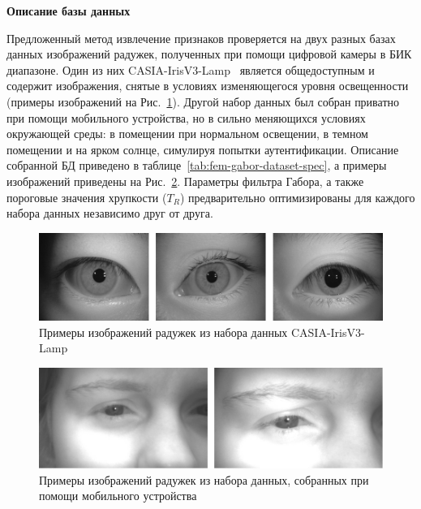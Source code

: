 {\bf Описание базы данных}
\label{sec:fem-gabor-dataset-desc}

Предложенный метод извлечение признаков проверяется на двух разных базах данных изображений радужек, полученных при помощи цифровой камеры в БИК диапазоне. Один из них CASIA-IrisV3-Lamp~\cite{casia_v3_lamp} является общедоступным и содержит изображения, снятые в условиях изменяющегося уровня освещенности (примеры изображений на Рис.~\ref{fig:fem-gabor-db-examples-casiav3}). Другой набор данных был собран приватно при помощи мобильного устройства, но в сильно меняющихся условиях окружающей среды: в помещении при нормальном освещении, в темном помещении и на ярком солнце, симулируя попытки аутентификации. Описание собранной БД приведено в таблице~\ref{tab:fem-gabor-dataset-spec}, а примеры изображений приведены на Рис.~\ref{fig:fem-gabor-db-examples-mobile}. Параметры фильтра Габора, а также пороговые значения хрупкости ($T_R$) предварительно оптимизированы для каждого набора данных независимо друг от друга.

\medspace
\begin{figure}[h]
	\begin{center}
		\includegraphics[width=0.75\columnwidth]{pictures/fem-gabor-db-examples-casiav3.png}
		\caption{Примеры изображений радужек из набора данных CASIA-IrisV3-Lamp}
		\label{fig:fem-gabor-db-examples-casiav3}
	\end{center}
\end{figure}

\begin{figure}[h]
	\begin{center}
		\includegraphics[width=0.75\columnwidth]{pictures/fem-gabor-db-examples-mobile.png}
		\caption{Примеры изображений радужек из набора данных, собранных при помощи мобильного устройства}
		\label{fig:fem-gabor-db-examples-mobile}
	\end{center}
\end{figure}

